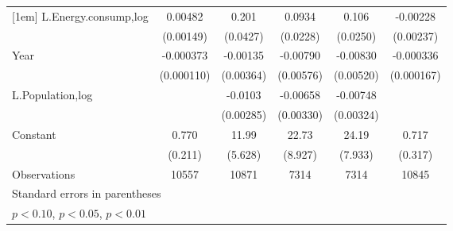 \begin{table}[htbp]
\begin{tabular}{l*{5}{c}}
[1em]
L.Energy.consump,log&     0.00482\sym{***}&       0.201\sym{***}&      0.0934\sym{***}&       0.106\sym{***}&    -0.00228         \\
                    &   (0.00149)         &    (0.0427)         &    (0.0228)         &    (0.0250)         &   (0.00237)         \\
[1em]
Year                &   -0.000373\sym{***}&    -0.00135         &    -0.00790         &    -0.00830         &   -0.000336\sym{**} \\
                    &  (0.000110)         &   (0.00364)         &   (0.00576)         &   (0.00520)         &  (0.000167)         \\
[1em]
L.Population,log    &                     &     -0.0103\sym{***}&    -0.00658\sym{**} &    -0.00748\sym{**} &                     \\
                    &                     &   (0.00285)         &   (0.00330)         &   (0.00324)         &                     \\
[1em]
Constant            &       0.770\sym{***}&       11.99\sym{**} &       22.73\sym{**} &       24.19\sym{***}&       0.717\sym{**} \\
                    &     (0.211)         &     (5.628)         &     (8.927)         &     (7.933)         &     (0.317)         \\
\hline
Observations        &       10557         &       10871         &        7314         &        7314         &       10845         \\
\hline\hline
\multicolumn{6}{l}{\footnotesize Standard errors in parentheses}\\
\multicolumn{6}{l}{\footnotesize \sym{*} \(p<0.10\), \sym{**} \(p<0.05\), \sym{***} \(p<0.01\)}\\
\end{tabular}
\end{table}
